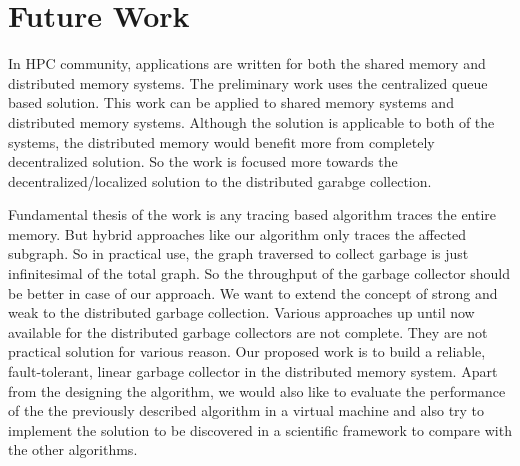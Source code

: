 \section{Future Work}

\iffalse
Local creation of links only allows the creation of strong references when no
cycle creation is possible. Consider the creation of a link from a source object $S$
to a target object $T$. The link will be created strong if (i) the only strong
links to $S$ are from roots i.e. there is no object $C$ with a strong link to $S$;
(ii) object $T$ has no outgoing links i.e. it is newly created and its outgoing links are
not initialized; and (iii) object $T$ is phantomized, and $S$ is not. All
self-references are weak. Any other link is created phantom or weak.
\fi


In HPC community, applications are written for both the shared memory and 
distributed memory systems. The preliminary work uses the centralized queue based 
solution. This work can be applied to shared memory systems and distributed memory 
systems. Although the solution is applicable to both of the systems, the distributed memory 
would benefit more from completely decentralized solution. So the work is focused more 
towards the decentralized/localized solution to the distributed garabge collection.




Fundamental thesis of the work is any tracing based algorithm traces the entire memory. 
But hybrid approaches like our algorithm only traces the affected subgraph. So in practical 
use, the graph traversed to collect garbage is just infinitesimal of the total graph. 
So the throughput of the garbage collector should be better in case of our approach. 
We want to extend the concept of strong and weak to the distributed garbage collection. 
Various approaches up until now available for the distributed garbage collectors are not complete.
They are not practical solution for various reason. Our proposed work is to build a reliable, 
fault-tolerant, linear garbage collector in the distributed memory system. Apart from 
the designing the algorithm, we would also like to evaluate the performance of the the 
previously described algorithm in a virtual machine and also  try to implement 
the solution to be discovered in a scientific framework to compare with the other algorithms.
